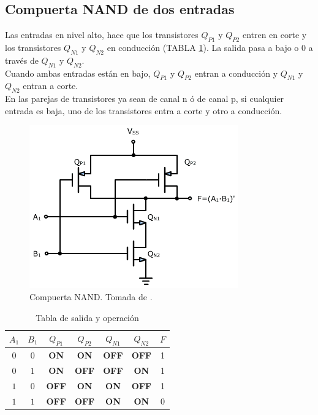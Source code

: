 \documentclass[twocolumn]{IEEEtran}
\begin{document}
\subsection{Compuerta NAND de dos entradas}
\noindent
Las entradas en nivel alto, hace que los transistores $Q_{P1}$ y $Q_{P2}$ entren en corte y los transistores $Q_{N1}$ y $Q_{N2}$ en conducción (TABLA \ref{tab1}). La salida pasa a bajo o $0$ a través de $Q_{N1}$ y $Q_{N2}$.\\
Cuando ambas entradas están en bajo, $Q_{P1}$ y $Q_{P2}$ entran a conducción y $Q_{N1}$ y $Q_{N2}$ entran a corte.\\
En las parejas de transistores ya sean de canal n ó de canal p, si cualquier entrada es baja, uno de los transistores entra a corte y otro a conducción.
\begin{figure}[H]
  \centering
    \includegraphics[scale=0.5]{fig1.png}
      \caption{Compuerta NAND. Tomada de \cite{page1}.}
	\label{fig1}
\end{figure}
\begin{table}[H]
  \caption{Tabla de salida y operación}
    \centering
      \begin{tabular}{|c|c|c|c|c|c|c|}\hline
      $A_1$ & $B_1$ & $Q_{P1}$ & $Q_{P2}$ & $Q_{N1}$ & $Q_{N2}$ & $F$ \\ \hline
      $0$ & $0$ & \bf ON & \bf ON & \bf OFF & \bf OFF & 1 \\ \hline
      $0$ & $1$ & \bf ON & \bf OFF & \bf OFF & \bf ON & 1 \\ \hline
      $1$ & $0$ & \bf OFF & \bf ON & \bf ON & \bf OFF & 1 \\ \hline
      $1$ & $1$ & \bf OFF & \bf OFF & \bf ON & \bf ON & 0 \\ \hline
      \end{tabular}
  \label{tab1}
\end{table}
\end{document}
